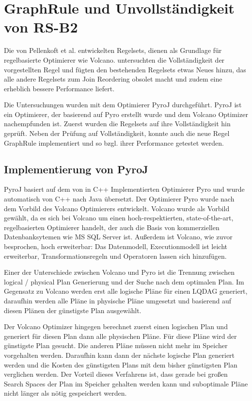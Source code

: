 \section{GraphRule und Unvollständigkeit von RS-B2}

Die von Pellenkoft et al. entwickelten Regelsets, dienen als Grundlage für regelbasierte Optimierer wie Volcano. \cite{shanbhag2014optimizing} untersuchten die Vollständigkeit der vorgestellten Regel und fügten den bestehenden Regelsets etwas Neues hinzu, das alle andere Regelsets zum Join Reordering obsolet macht und zudem eine erheblich bessere Performance liefert.

Die Untersuchungen \cite{shanbhag2014optimizing} wurden mit dem Optimierer PyroJ durchgeführt. PyroJ ist ein Optimierer, der basierend auf Pyro \cite{roy2001multi} erstellt wurde und dem Volcano Optimizer nachempfunden ist. Zuerst wurden die Regelsets auf ihre Vollständigkeit hin geprüft. Neben der Prüfung auf Vollständigkeit, konnte auch die neue Regel GraphRule implementiert und so bzgl. ihrer Performance getestet werden.



\subsection{Implementierung von PyroJ}

PyroJ basiert auf dem von \cite{roy2001multi} in C++ Implementierten Optimierer Pyro und wurde automatisch von C++ nach Java übersetzt. Der Optimierer Pyro wurde nach dem Vorbild des Volcano Optimierers entwickelt. Volcano wurde als Vorbild gewählt, da es sich bei Volcano um einen hoch-respektierten, state-of-the-art, regelbasierten Optimierer handelt, der auch die Basis von kommerziellen Datenbanksytemen wie MS SQL Server ist. Außerdem ist Volcano, wie zuvor besprochen, hoch erweiterbar: Das Datenmodell, Executionmodell ist leicht erweiterbar, Transformationsregeln und Operatoren lassen sich hinzufügen. 

Einer der Unterschiede zwischen Volcano und Pyro ist die Trennung zwischen logical / physical Plan Generierung und der Suche nach dem optimalen Plan. Im Gegensatz zu Volcano werden erst alle logische Pläne für einen \ac{LQDAG} generiert, daraufhin werden alle Pläne in physische Pläne umgesetzt und basierend auf diesen Plänen der günstigste Plan ausgewählt.

Der Volcano Optimizer hingegen berechnet zuerst einen logischen Plan und generiert für diesen Plan dann alle physischen Pläne. Für diese Pläne wird der günstigste Plan gesucht. Die anderen Pläne müssen nicht mehr im Speicher vorgehalten werden. Daraufhin kann dann der nächste logische Plan generiert werden und die Kosten des günstigsten Plans mit dem bisher günstigsten Plan verglichen werden. Der Vorteil dieses Verfahrens ist, dass gerade bei großen Search Spaces der Plan im Speicher gehalten werden kann und suboptimale Pläne nicht länger als nötig gespeichert werden.

